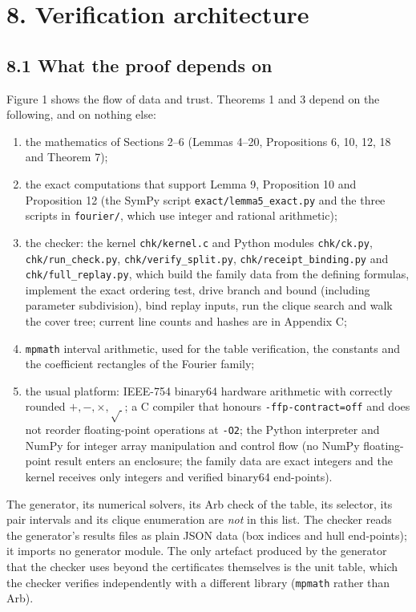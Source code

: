 \documentclass[
  11pt,
]{article}
\providecommand{\tightlist}{%
  \setlength{\itemsep}{0pt}\setlength{\parskip}{0pt}}
\begin{document}
\section{8. Verification architecture}\label{verification-architecture}

\subsection{8.1 What the proof depends
on}\label{what-the-proof-depends-on}

Figure 1 shows the flow of data and trust. Theorems 1 and 3 depend on
the following, and on nothing else:

\begin{enumerate}
\def\labelenumi{\arabic{enumi}.}
\tightlist
\item
  the mathematics of Sections 2--6 (Lemmas 4--20, Propositions 6, 10,
  12, 18 and Theorem 7);
\item
  the exact computations that support Lemma 9, Proposition 10 and
  Proposition 12 (the SymPy script \texttt{exact/lemma5\_exact.py} and
  the three scripts in \texttt{fourier/}, which use integer and rational
  arithmetic);
\item
  the checker: the kernel \texttt{chk/kernel.c} and Python modules
  \texttt{chk/ck.py}, \texttt{chk/run\_check.py},
  \texttt{chk/verify\_split.py}, \texttt{chk/receipt\_binding.py} and
  \texttt{chk/full\_replay.py}, which build the family data from the
  defining formulas, implement the exact ordering test, drive branch and
  bound (including parameter subdivision), bind replay inputs, run the
  clique search and walk the cover tree; current line counts and hashes
  are in Appendix C;
\item
  \texttt{mpmath} interval arithmetic, used for the table verification,
  the constants and the coefficient rectangles of the Fourier family;
\item
  the usual platform: IEEE-754 binary64 hardware arithmetic with
  correctly rounded \(+,-,\times,\sqrt{\ }\); a C compiler that honours
  \texttt{-ffp-contract=off} and does not reorder floating-point
  operations at \texttt{-O2}; the Python interpreter and NumPy for
  integer array manipulation and control flow (no NumPy floating-point
  result enters an enclosure; the family data are exact integers and the
  kernel receives only integers and verified binary64 end-points).
\end{enumerate}

The generator, its numerical solvers, its Arb check of the table, its
selector, its pair intervals and its clique enumeration are \emph{not}
in this list. The checker reads the generator's results files as plain
JSON data (box indices and hull end-points); it imports no generator
module. The only artefact produced by the generator that the checker
uses beyond the certificates themselves is the unit table, which the
checker verifies independently with a different library (\texttt{mpmath}
rather than Arb).
\end{document}
